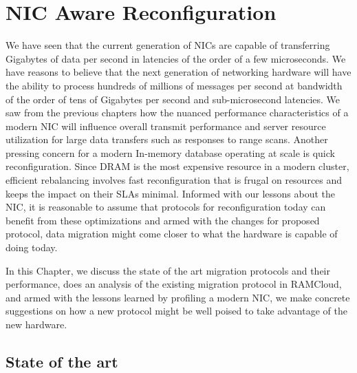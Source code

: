 
\chapter{NIC Aware Reconfiguration}
\label{chap:migration}
We have seen that the current generation of NICs are capable of transferring Gigabytes of 
data per second in latencies of the order of a few microseconds. We have reasons to believe 
that the next generation of networking hardware will have the ability to process 
hundreds of millions of messages per second at bandwidth of the order of tens of Gigabytes per 
second and sub-microsecond latencies\cite{cx6}.
We saw from the previous chapters how the nuanced performance characteristics of 
a modern NIC will influence overall transmit performance and server resource utilization 
for large data transfers such as responses to range scans. Another pressing 
concern for a modern In-memory database operating at scale is quick reconfiguration. 
Since DRAM is the most expensive resource in a modern cluster, efficient rebalancing 
involves fast reconfiguration that is frugal on resources and keeps the impact on their 
SLAs minimal. Informed with our lessons about the NIC, it is reasonable to assume that protocols for reconfiguration 
today can benefit from these optimizations and armed with the changes for proposed protocol, data migration might come 
closer to what the hardware is capable of doing today.

In this Chapter, we discuss the state of the art migration protocols and their 
performance, does an analysis of the existing migration protocol in RAMCloud, 
and armed with the lessons learned by profiling a modern NIC, we make concrete 
suggestions on how a new protocol might be well poised to take advantage of the 
new hardware.
\section{State of the art}


